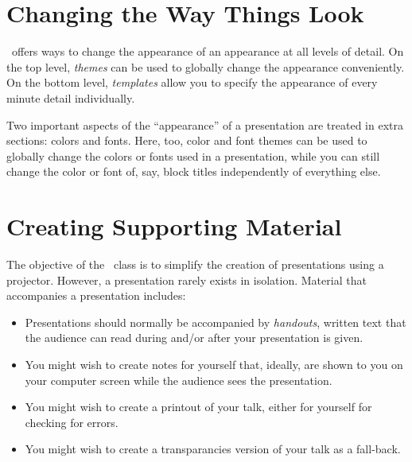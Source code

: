 \documentclass{ltxdoc}
\begin{document}











\part{Changing the Way Things Look}

\beamer\ offers ways to change the appearance of an appearance at all
levels of detail. On the top level, \emph{themes} can be used to
globally change the appearance conveniently. On the bottom level,
\emph{templates} allow you to specify the appearance of every minute
detail individually.

Two important aspects of the ``appearance'' of a presentation are
treated in extra sections: colors and fonts. Here, too, color and
font themes can be used to globally change the colors or fonts used in
a presentation, while you can still change the color or font of, say,
block titles independently of everything else. 









\part{Creating Supporting Material}

The objective of the \beamer\ class is to simplify the creation of
presentations using a projector. However, a presentation rarely exists
in isolation. Material that accompanies a presentation includes:
\begin{itemize}
\item
  Presentations should normally be accompanied by 
  \emph{handouts}, written text that the audience can read during
  and/or after your presentation is given.
\item
  You might wish to create notes for yourself that, ideally, are shown
  to you on your computer screen while the audience sees the
  presentation. 
\item
  You might wish to create a printout of your talk, either for
  yourself for checking for errors.
\item
  You might wish to create a transparancies version of your talk as a
  fall-back.
\end{itemize}
\end{document}
